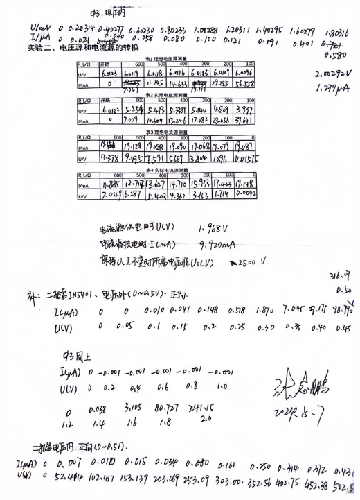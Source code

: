 \documentclass[a4paper]{article}
\begin{document}
\begin{center}
    \includegraphics[width=\textwidth]{013}\\
\end{center}
\end{document}
